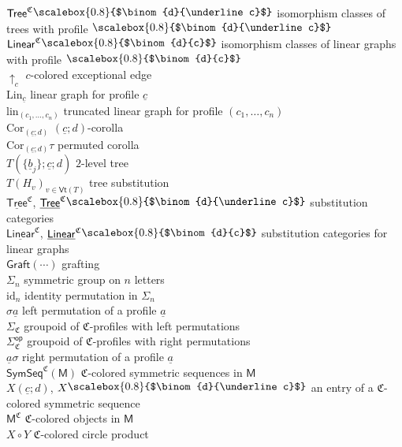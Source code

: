 \documentclass[11pt]{amsbook}
\numberwithin{section}{chapter}
\numberwithin{subsection}{section}
\numberwithin{equation}{section}
\theoremstyle{plain}
\theoremstyle{definition}
\newcommand{\colorc}{\mathfrak{C}}
\newcommand{\Cor}{\mathrm{Cor}}
\newcommand{\graft}{\mathsf{Graft}}
\newcommand{\Lin}{\mathrm{Lin}}
\newcommand{\lin}{\mathrm{lin}}
\newcommand{\Vt}{\mathsf{Vt}}
\newcommand{\op}{\mathsf{op}}
\newcommand{\M}{\mathsf{M}}
\newcommand{\id}{\mathrm{id}}
\newcommand{\Linear}{\mathsf{Linear}}
\newcommand{\uLinear}{\underline{\Linear}}
\newcommand{\Linearc}{\Linear^{\colorc}}
\newcommand{\uLinearc}{\uLinear^{\colorc}}
\newcommand{\Tree}{\mathsf{Tree}}
\newcommand{\uTree}{\underline{\Tree}}
\newcommand{\Treec}{\Tree^{\colorc}}
\newcommand{\uTreec}{\uTree^{\colorc}}
\newcommand{\Sigmaop}{\Sigma^{\op}}
\newcommand{\Sigmac}{\Sigma_{\colorc}}
\newcommand{\Sigmacop}{\Sigmaop_{\colorc}}
\newcommand{\symseq}{\mathsf{SymSeq}}
\newcommand{\symseqcm}{\symseq^{\colorc}(\M)}
\newcommand{\ua}{\underline a}
\newcommand{\ub}{\underline b}
\newcommand{\uc}{\underline c}
\newcommand{\smallprof}[1]
{\raisebox{.05cm}{\scalebox{0.8}{#1}}}
\newcommand{\dc}{\smallprof{$\binom{d}{c}$}}
\newcommand{\duc}{\smallprof{$\binom{d}{\uc}$}}
\begin{document}
\begin{tabbing}
$\Treec\duc$  isomorphism classes of trees with profile $\duc$\\
$\Linearc\dc$  isomorphism classes of linear graphs with profile $\dc$\\
$\uparrow_c$  $c$-colored exceptional edge\\
$\Lin_{\uc}$  linear graph for profile $\uc$\\
$\lin_{(c_1,\ldots,c_n)}$  truncated linear graph for profile $(c_1,\ldots,c_n)$\\
$\Cor_{(\uc;d)}$  $(\uc;d)$-corolla\\
$\Cor_{(\uc;d)}\tau$  permuted corolla\\
$T\left(\{\ub_j\};\uc;d\right)$  $2$-level tree\\
$T(H_v)_{v\in \Vt(T)}$  tree substitution\\
$\uTreec$, $\uTreec\duc$  substitution categories\\
$\uLinearc$, $\uLinearc\dc$  substitution categories for linear graphs\\
$\graft(\cdots)$  grafting\\
$\Sigma_n$  symmetric group on $n$ letters\\
$\id_n$  identity permutation in $\Sigma_n$\\
$\sigma\ua$  left permutation of a profile $\ua$\\
$\Sigmac$  groupoid of $\colorc$-profiles with left permutations\\
$\Sigmacop$  groupoid of $\colorc$-profiles with right permutations\\
$\ua\sigma$  right permutation of a profile $\ua$\\
$\symseqcm$  $\colorc$-colored symmetric sequences in $\M$\\
$X(\uc;d)$, $X\duc$  an entry of a $\colorc$-colored symmetric sequence\\
$\M^{\colorc}$  $\colorc$-colored objects in $\M$\\
$X \circ Y$  $\colorc$-colored circle product\\

\end{tabbing}
\end{document}
